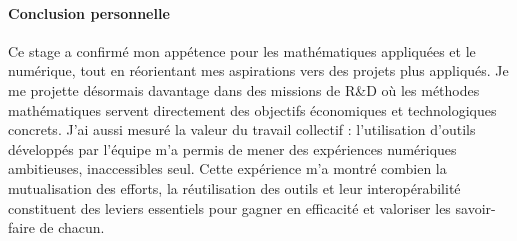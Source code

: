\paragraph*{Conclusion personnelle}\label{par:cc3}
Ce stage a confirmé mon appétence pour les mathématiques appliquées et le numérique, tout en réorientant mes aspirations vers des projets plus appliqués.
Je me projette désormais davantage dans des missions de R\&D où les méthodes mathématiques servent directement des objectifs économiques et technologiques concrets.
J’ai aussi mesuré la valeur du travail collectif : l’utilisation d’outils développés par l’équipe m’a permis de mener des expériences numériques ambitieuses, inaccessibles seul.
Cette expérience m’a montré combien la mutualisation des efforts, la réutilisation des outils et leur interopérabilité constituent des leviers essentiels pour gagner en efficacité et valoriser les savoir-faire de chacun.
